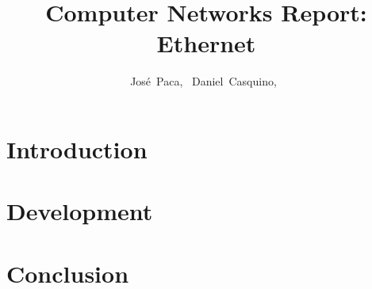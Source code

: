 \documentclass[journal]{IEEEtran}
\begin{document}
\title{Computer Networks Report: Ethernet}

\author{José~Paca,~
	Daniel~Casquino,~
}

%
\maketitle

\IEEEpeerreviewmaketitle{}

\section{Introduction}


\section{Development}


\section{Conclusion}


\ifCLASSOPTIONcaptionsoff{}
\newpage
\fi



\end{document}
